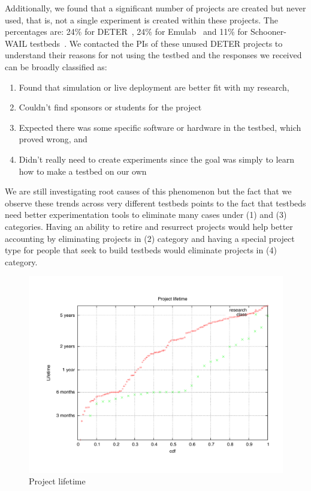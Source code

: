 \documentclass[10pt]{article}
\begin{document}
Additionally, we found that
 a significant number of projects are created but never used,  that is, 
  not a single experiment is created within these projects. 
The percentages are: 24\% for DETER~\cite{Deter}, 24\% for Emulab~\cite{Emulab} 
 and 11\% for Schooner-WAIL testbeds~\cite{Wail}. 
We contacted the PIs of these unused DETER projects to understand their reasons for not using the 
 testbed and the responses we received can be broadly classified as: 
\begin{enumerate}
\item Found that simulation or live deployment are better fit with my research, 
\item Couldn't find sponsors or students for the project
\item Expected there was some specific software or hardware in the testbed, which proved wrong, and
\item Didn't really need to create experiments since the goal was simply to learn how to make a testbed on our own
\end{enumerate}
We are still investigating root causes of this phenomenon but the fact
that we observe these trends across very different testbeds points to the fact that
testbeds need better experimentation tools to eliminate many
cases under (1) and (3) categories. Having an ability to retire and resurrect projects would help 
better accounting by eliminating projects in (2) category and having a special project type for 
people that seek to build testbeds would eliminate projects in (4) category.

\begin{figure}[htbp]
\begin{center}
\includegraphics[width=5in]{figs/projlife.pdf}
\caption{Project lifetime}
\label{projlife}
\end{center}
\end{figure}
\end{document}
